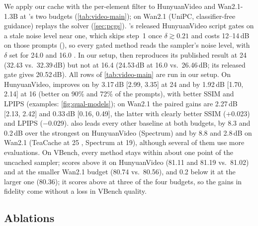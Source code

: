 We apply our cache with the per-element filter to HunyuanVideo and Wan2.1-1.3B at \seacache's two budgets
(\cref{tab:video-main}); on Wan2.1 (UniPC, classifier-free guidance) \pcgs replays the solver (\cref{sec:pcgs}).
\seacache's released HunyuanVideo script gates on a stale noise level near one, which skips step~1 once
$\delta\gtrsim0.21$ and costs 12--14\,dB on those prompts (), so every gated method reads the sampler's noise
level, with $\delta$ set for 24.0 and 16.0 \nfe.
In our setup, \seacache then reproduces its published result at 24 \nfe (32.43 vs.\ 32.39\,dB) but not at 16.4
(24.53\,dB at 16.0 vs.\ 26.46\,dB; its released gate gives 20.52\,dB). All rows of \cref{tab:video-main} are run in
our setup. On HunyuanVideo, \ours improves on \seacache by 3.17\,dB [2.99, 3.35] at 24 \nfe and by 1.92\,dB
[1.70, 2.14] at 16 \nfe (better on 90\% and 72\% of the prompts), with better SSIM and LPIPS (examples:
\cref{fig:qual-models}); on Wan2.1 the paired gains are 2.27\,dB [2.13, 2.42] and 0.33\,dB [0.16, 0.49], the latter
with clearly better SSIM ($+$0.023) and LPIPS ($-$0.029). \ours also leads every other baseline at both budgets, by 8.3
and 0.2\,dB over the strongest on HunyuanVideo (Spectrum) and by 8.8 and 2.8\,dB on Wan2.1 (TeaCache at 25 \nfe,
Spectrum at 19), although several of them use more evaluations. On VBench, every method stays within about one point
of the uncached sampler; \ours scores above it on HunyuanVideo (81.11 and 81.19 vs.\ 81.02) and at the smaller Wan2.1
budget (80.74 vs.\ 80.56), and 0.2 below it at the larger one (80.36); it scores above \seacache at three of the four
budgets, so the gains in fidelity come without a loss in VBench quality.

\subsection{Ablations}
\label{sec:ablations}


